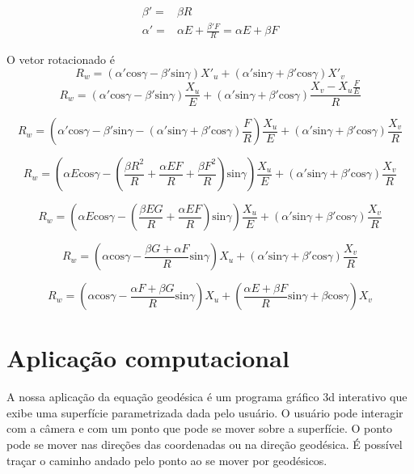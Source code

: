 \documentclass{article}
\begin{document}
\begin{equation*}
    \begin{array}{cc}
        \beta'  = & \beta R \\
        \alpha' = &\alpha E + \frac{\beta' F}{R} = \alpha E + \beta F
    \end{array}
\end{equation*}

O vetor rotacionado é
\[R_w = (\alpha' \text{cos} \gamma - \beta' \text{sin} \gamma)X'_u + (\alpha' \text{sin} \gamma + \beta' \text{cos} \gamma)X'_v\]
\[R_w = (\alpha' \text{cos} \gamma - \beta' \text{sin} \gamma)\frac{X_u}{E} + (\alpha' \text{sin} \gamma + \beta' \text{cos} \gamma)\frac{X_v - X_u\frac{F}{E}}{R}\]

\[R_w = \left( \alpha' \text{cos} \gamma - \beta' \text{sin} \gamma - (\alpha' \text{sin} \gamma + \beta' \text{cos} \gamma)\frac{F}{R} \right)\frac{X_u}{E} + \left( \alpha' \text{sin} \gamma + \beta' \text{cos} \gamma \right)\frac{X_v}{R}\]

\[R_w = \left( \alpha E \text{cos} \gamma - ( \frac{\beta R^2}{R} + \frac{\alpha EF}{R} + \frac{\beta F^2}{R})\text{sin} \gamma \right)\frac{X_u}{E} + \left( \alpha' \text{sin} \gamma + \beta' \text{cos} \gamma \right)\frac{X_v}{R}\]

\[R_w = \left( \alpha E \text{cos} \gamma - ( \frac{\beta EG}{R} + \frac{\alpha EF}{R})\text{sin} \gamma \right)\frac{X_u}{E} + \left( \alpha' \text{sin} \gamma + \beta' \text{cos} \gamma \right)\frac{X_v}{R}\]

\[R_w = \left( \alpha \text{cos} \gamma - \frac{\beta G + \alpha F}{R}\text{sin} \gamma \right)X_u + \left( \alpha' \text{sin} \gamma + \beta' \text{cos} \gamma \right)\frac{X_v}{R}\]

\[R_w = \left( \alpha \text{cos} \gamma - \frac{\alpha F + \beta G}{R}\text{sin} \gamma \right)X_u + \left( \frac{\alpha E + \beta F}{R} \text{sin} \gamma + \beta \text{cos} \gamma \right)X_v\]

\section{Aplicação computacional}
A nossa aplicação da equação geodésica é um programa gráfico 3d interativo que exibe uma superfície parametrizada dada pelo usuário. O usuário pode interagir com a câmera e com um ponto que pode se mover sobre a superfície. O ponto pode se mover nas direções das coordenadas ou na direção geodésica. É possível traçar o caminho andado pelo ponto ao se mover por geodésicos.
\end{document}
